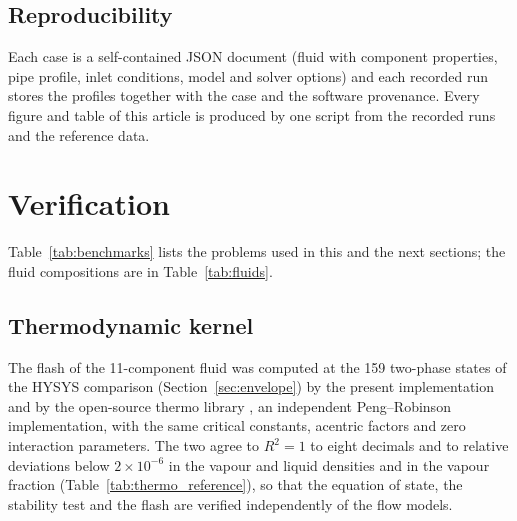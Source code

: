 \documentclass[a4paper,fleqn]{cas-sc}
\begin{document}
\subsection{Reproducibility}\label{sec:implementation}

Each case is a self-contained JSON document (fluid with component properties, pipe profile, inlet conditions, model and solver options) and each recorded run stores the profiles together with the case and the software provenance. Every figure and table of this article is produced by one script from the recorded runs and the reference data.

\section{Verification}\label{sec:verification}

Table~\ref{tab:benchmarks} lists the problems used in this and the next sections; the fluid compositions are in Table~\ref{tab:fluids}.

\begin{table}[htbp]
\caption{Problems, fluids and references.}\label{tab:benchmarks}
\footnotesize


\end{table}

\subsection{Thermodynamic kernel}\label{sec:thermo_verification}

The flash of the 11-component fluid was computed at the 159 two-phase states of the HYSYS comparison (Section~\ref{sec:envelope}) by the present implementation and by the open-source thermo library \citep{thermo2024}, an independent Peng--Robinson implementation, with the same critical constants, acentric factors and zero interaction parameters. The two agree to $R^2 = 1$ to eight decimals and to relative deviations below $2\times10^{-6}$ in the vapour and liquid densities and in the vapour fraction (Table~\ref{tab:thermo_reference}), so that the equation of state, the stability test and the flash are verified independently of the flow models.

\begin{table}[htbp]
\caption{Flash of the 11-component fluid at 159 states: this work against an independent open-source Peng--Robinson implementation.}\label{tab:thermo_reference}
\footnotesize


\end{table}
\end{document}
